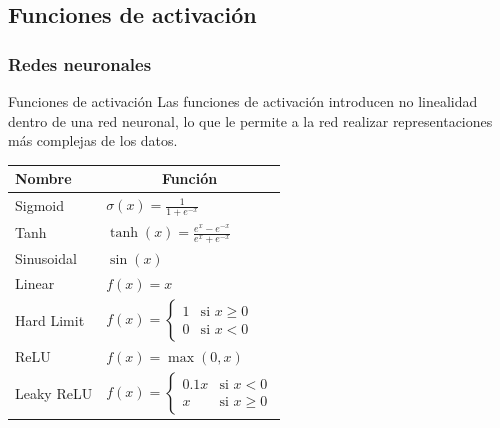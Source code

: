 \documentclass[
  11,
  ignorenonframetext,
  aspectratio=169,
  xcolor=table,
]{beamer}
\begin{document}
\subsection{Funciones de activación}
\begin{frame}[shrink=10]
  \frametitle{Redes neuronales}
  \protect\hypertarget{redes-neuronales-1}{}
  \begin{block}{Funciones de activación}
    \protect\hypertarget{funciones-de-activaciuxf3n}{}
    Las funciones de activación introducen no linealidad dentro de una red
    neuronal, lo que le permite a la red realizar representaciones más
    complejas de los datos.

    \begin{table}[]
      \begin{tabular}{|l|l|}
        \hline
        \textbf{Nombre} & \multicolumn{1}{c|}{\textbf{Función}}                                                 \\ \hline
        Sigmoid         & $\sigma(x) = \frac{1}{1 + e^{-x}}$                                                    \\ \hline
        Tanh            & $\tanh(x) = \frac{e^x - e^{-x}}{e^x + e^{-x}}$                                        \\ \hline
        Sinusoidal      & $\sin(x)$                                                                             \\ \hline
        Linear          & $f(x) = x$                                                                            \\ \hline
        Hard Limit      & $f(x) = \begin{cases} 1 & \text{si } x \geq 0 \\ 0 & \text{si } x < 0 \end{cases}$    \\ \hline
        ReLU            & $f(x) = \max(0, x)$                                                                   \\ \hline
        Leaky ReLU      & $f(x) = \begin{cases} 0.1x & \text{si } x < 0 \\ x & \text{si } x \geq 0 \end{cases}$ \\ \hline
      \end{tabular}
    \end{table}
  \end{block}
\end{frame}
\end{document}
